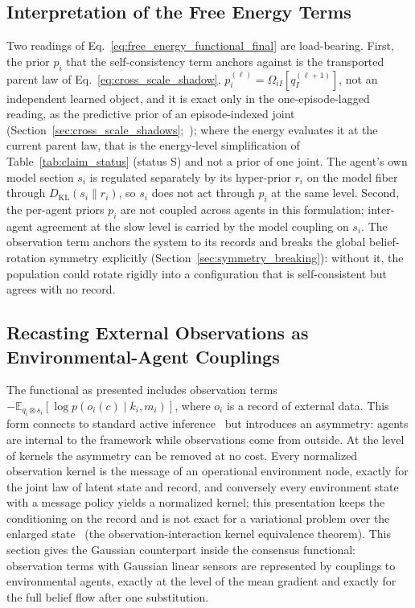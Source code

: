 \subsection{Interpretation of the Free Energy Terms}

Two readings of Eq.~\eqref{eq:free_energy_functional_final} are load-bearing. First, the prior $p_i$ that the self-consistency term anchors against is the transported parent law of Eq.~\eqref{eq:cross_scale_shadow}, $p_i^{(\ell)} = \Omega_{iI}[q_I^{(\ell+1)}]$, not an independent learned object, and it is exact only in the one-episode-lagged reading, as the predictive prior of an episode-indexed joint (Section~\ref{sec:cross_scale_shadows};~\cite[Ch.~12]{DennisGaugeVFE2026}); where the energy evaluates it at the current parent law, that is the energy-level simplification of Table~\ref{tab:claim_status} (status S) and not a prior of one joint. The agent's own model section $s_i$ is regulated separately by its hyper-prior $r_i$ on the model fiber through $D_{\mathrm{KL}}(s_i\|r_i)$, so $s_i$ does not act through $p_i$ at the same level. Second, the per-agent priors $p_i$ are not coupled across agents in this formulation; inter-agent agreement at the slow level is carried by the model coupling on $s_i$. The observation term anchors the system to its records and breaks the global belief-rotation symmetry explicitly (Section~\ref{sec:symmetry_breaking}): without it, the population could rotate rigidly into a configuration that is self-consistent but agrees with no record.

\subsection{Recasting External Observations as Environmental-Agent Couplings}

The functional as presented includes observation terms $-\mathbb{E}_{q_i\otimes s_i}[\log p(o_i(c)\mid k_i,m_i)]$, where $o_i$ is a record of external data. This form connects to standard active inference~\cite{Friston2010, parr2022active} but introduces an asymmetry: agents are internal to the framework while observations come from outside. At the level of kernels the asymmetry can be removed at no cost. Every normalized observation kernel is the message of an operational environment node, exactly for the joint law of latent state and record, and conversely every environment state with a message policy yields a normalized kernel; this presentation keeps the conditioning on the record and is not exact for a variational problem over the enlarged state~\cite[Ch.~5]{DennisGaugeVFE2026} (the observation-interaction kernel equivalence theorem). This section gives the Gaussian counterpart inside the consensus functional: observation terms with Gaussian linear sensors are represented by couplings to environmental agents, exactly at the level of the mean gradient and exactly for the full belief flow after one substitution.

